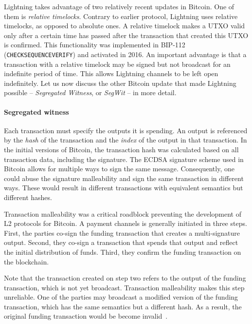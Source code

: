 Lightning takes advantage of two relatively recent updates in Bitcoin.
One of them is \textit{relative timelocks}.
Contrary to earlier protocol, Lightning uses relative timelocks, as opposed to absolute ones.
A relative timelock makes a UTXO valid only after a certain time has passed after the transaction that created this UTXO is confirmed.
This functionality was implemented in BIP-112~\cite{BtcDrak2015} (\texttt{CHECKSEQUENCEVERIFY}) and activated in 2016.
An important advantage is that a transaction with a relative timelock may be signed but not broadcast for an indefinite period of time.
This allows Lightning channels to be left open indefinitely.
Let us now discuss the other Bitcoin update that made Lightning possible -- \textit{Segregated Witness}, or \textit{SegWit} -- in more detail.


\paragraph{Segregated witness}

Each transaction must specify the outputs it is spending.
An output is referenced by the \textit{hash} of the transaction and the \textit{index} of the output in that transaction.
In the initial versions of Bitcoin, the transaction hash was calculated based on all transaction data, including the signature.
The ECDSA signature scheme used in Bitcoin allows for multiple ways to sign the same message.
Consequently, one could abuse the signature malleability and sign the same transaction in different ways.
These would result in different transactions with equivalent semantics but different hashes.

Transaction malleability was a critical roadblock preventing the development of L2 protocols for Bitcoin.
A payment channels is generally initiated in three steps.
First, the parties co-sign the funding transaction that creates a multi-signature output.
Second, they co-sign a transaction that spends that output and reflect the initial distribution of funds.
Third, they confirm the funding transaction on the blockchain.

Note that the transaction created on step two refers to the output of the funding transaction, which is not yet broadcast.
Transaction malleability makes this step unreliable.
One of the parties may broadcast a modified version of the funding transaction, which has the same semantics but a different hash.
As a result, the original funding transaction would be become invalid~\cite{Harding2016}.

